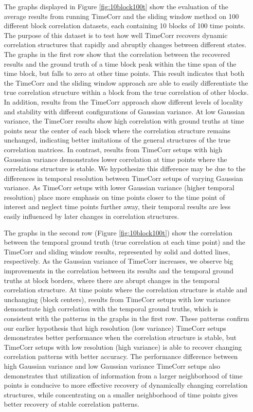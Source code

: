 \documentclass[11pt]{article}
\begin{document}
The graphs displayed in Figure \ref{fig:10block100t} show the evaluation of the average results from running TimeCorr and the sliding window method on 100 different block correlation datasets, each containing 10 blocks of 100 time points. The purpose of this dataset is to test how well TimeCorr recovers dynamic correlation structures that rapidly and abruptly changes between different states. The graphs in the first row show that the correlation between the recovered results and the ground truth of a time block peak within the time span of the time block, but falls to zero at other time points. This result indicates that both the TimeCorr and the sliding window approach are able to easily differentiate the true correlation structure within a block from the true correlation of other blocks. In addition, results from the TimeCorr approach show different levels of locality and stability with different configurations of Gaussian variance. At low Gaussian variance, the TimeCorr results show high correlation with ground truths at time points near the center of each block where the correlation structure remains unchanged, indicating better imitations of the general structures of the true correlation matrices. In contrast, results from TimeCorr setups with high Gaussian variance demonstrates lower correlation at time points where the correlations structure is stable. We hypothesize this difference may be due to the differences in temporal resolution between TimeCorr setups of varying Gaussian variance. As TimeCorr setups with lower Gaussian variance (higher temporal resolution) place more emphasis on time points closer to the time point of interest and neglect time points further away, their temporal results are less easily influenced by later changes in correlation structures.

The graphs in the second row (Figure \ref{fig:10block100t}) show the correlation between the temporal ground truth (true correlation at each time point) and the TimeCorr and sliding window results, represented by solid and dotted lines, respectively. As the Gaussian variance of TimeCorr increases, we observe big improvements in the correlation between its results and the temporal ground truths at block borders, where there are abrupt changes in the temporal correlation structure. At time points where the correlation structure is stable and unchanging (block centers), results from TimeCorr setups with low variance demonstrate high correlation with the temporal ground truths, which is consistent with the patterns in the graphs in the first row. These patterns confirm our earlier hypothesis that high resolution (low variance) TimeCorr setups demonstrates better performance when the correlation structure is stable, but TimeCorr setups with low resolution (high variance) is able to recover changing correlation patterns with better accuracy. The performance difference between high Gaussian variance and low Gaussian variance TimeCorr setups also demonstrates that utilization of information from a larger neighborhood of time points is conducive to more effective recovery of dynamically changing correlation structures, while concentrating on a smaller neighborhood of time points gives better recovery of stable correlation patterns.
\end{document}
